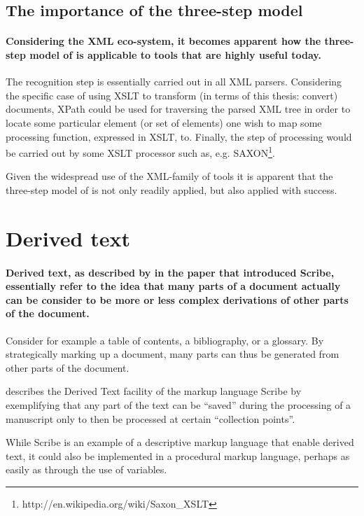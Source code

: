 \documentclass{scrreprt}
\begin{document}
\subsection{The importance of the three-step model}
\paragraph{Considering the XML eco-system, it becomes apparent how the three-step model of \citet{goldfarb} is applicable to tools that are highly useful today.} The recognition step is essentially carried out in all XML parsers. Considering the specific case of using XSLT to transform (in terms of this thesis: convert) documents, XPath could be used for traversing the parsed XML tree in order to locate some particular element (or set of elements) one wish to map some processing function, expressed in XSLT, to. Finally, the step of processing would be carried out by some XSLT processor such as, e.g. SAXON\footnote{ http://en.wikipedia.org/wiki/Saxon\_XSLT}.

Given the widespread use of the XML-family of tools it is apparent that the three-step model of \citet{goldfarb} is not only readily applied, but also applied with success.





\section{Derived text}
\label{sec:theory:derived-text}
\paragraph{Derived text, as described by \citet{reid} in the paper that introduced Scribe, essentially refer to the idea that many parts of a document actually can be consider to be more or less complex derivations of other parts of the document.} Consider for example a table of contents, a bibliography, or a glossary. By strategically marking up a document, many parts can thus be generated from other parts of the document.

\citet{reid} describes the Derived Text facility of the markup language Scribe by exemplifying that any part of the text can be ``saved'' during the processing of a manuscript only to then be processed at certain ``collection points''.

While Scribe is an example of a descriptive markup language that enable derived text, it could also be implemented in a procedural markup language, perhaps as easily as through the use of variables.
\end{document}

